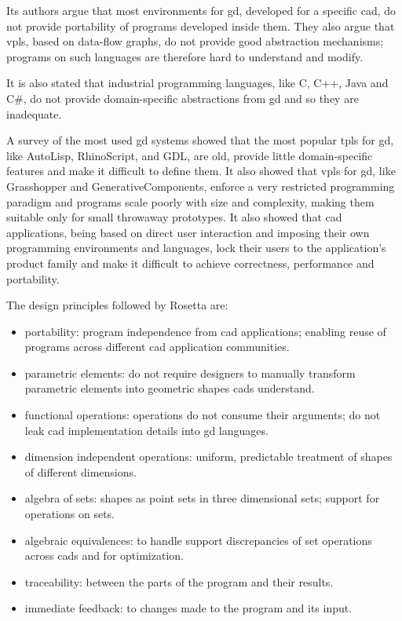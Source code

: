 \documentclass{./llncs2e/llncs}
\begin{document}
	Its authors argue that most environments for \ac{gd}, developed for a specific \ac{cad}, do not provide portability of programs developed inside them.
	They also argue that \ac{vpl}s, based on data-flow graphs, do not provide good abstraction mechanisms; programs on such languages are therefore hard to understand and modify.
	
	It is also stated that industrial programming languages, like C, C++, Java and C\#, do not provide domain-specific abstractions from \ac{gd} and so they are inadequate.
	
	A survey of the most used \ac{gd} systems showed that the most popular \ac{tpl}s for \ac{gd}, like AutoLisp, RhinoScript, and GDL, are old, provide little domain-specific features and make it difficult to define them\cite{de2012modern,leitao2012programming}.
	It also showed that \ac{vpl}s for \ac{gd}, like Grasshopper and GenerativeComponents, enforce a very restricted programming paradigm and programs scale poorly with size and complexity, making them suitable only for small throwaway prototypes. 
	It also showed that \ac{cad} applications, being based on direct user interaction and imposing their own programming environments and languages, lock their users to the application's product family and make it difficult to achieve correctness, performance and portability.
	
	The design principles followed by Rosetta are:
	\begin{itemize}
		\item portability: program independence from \ac{cad} applications; enabling reuse of programs across different \ac{cad} application communities.
		\item parametric elements: do not require designers to manually transform parametric elements into geometric shapes \ac{cad}s understand.
		\item functional operations: operations do not consume their arguments; do not leak \ac{cad} implementation details into \ac{gd} languages.
		\item dimension independent operations: uniform, predictable treatment of shapes of different dimensions.
		\item algebra of sets: shapes as point sets in three dimensional sets; support for operations on sets.
		\item algebraic equivalences: to handle support discrepancies of set operations across \ac{cad}s and for optimization.
		\item traceability: between the parts of the program and their results.
		\item immediate feedback: to changes made to the program and its input.
	\end{itemize}
	
\end{document}
